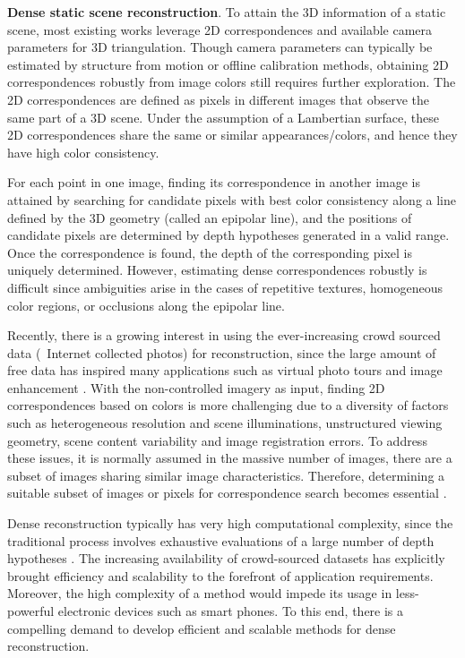 \textbf{Dense static scene reconstruction}.
To attain the 3D information of a static scene, most existing works leverage 2D correspondences and available camera parameters for 3D triangulation. Though camera parameters can typically be estimated by structure from motion or offline calibration methods, obtaining 2D correspondences robustly from image colors still requires further exploration. The 2D correspondences are defined as pixels in different images that observe the same part of a 3D scene. Under the assumption of a Lambertian surface, these 2D correspondences share the same or similar appearances/colors, and hence they have high color consistency.

For each point in one image, finding its correspondence in another image is attained by searching for candidate pixels with best color consistency along a line defined by the 3D geometry (called an epipolar line), and the positions of candidate pixels are determined by depth hypotheses generated in a valid range. Once the correspondence is found, the depth of the corresponding pixel is uniquely determined. However, estimating dense correspondences robustly is difficult since ambiguities arise in the cases of repetitive textures, homogeneous color regions, or occlusions along the epipolar line. 

Recently, there is a growing interest in using the ever-increasing crowd sourced data (\ie~Internet collected photos) for reconstruction, since the large amount of free data has inspired many applications such as virtual photo tours \cite{Snavely2} and image enhancement \cite{zhang2014personal}. With the non-controlled imagery as input, finding 2D correspondences based on colors is more challenging due to a diversity of factors such as heterogeneous resolution and scene illuminations, unstructured viewing geometry, scene content variability and image registration errors. To address these issues, it is normally assumed in the massive number of images, there are a subset of images sharing similar image characteristics. Therefore, determining a suitable subset of images or pixels for correspondence search becomes essential \cite{Goesele07}.

Dense reconstruction typically has very high computational complexity, since the traditional process involves exhaustive evaluations of a large number of depth hypotheses \cite{yang2003multi}. The increasing availability of crowd-sourced datasets has explicitly brought efficiency and scalability to the forefront of application requirements.  Moreover, the high complexity of a method would impede its usage in less-powerful electronic devices such as smart phones. To this end, there is a compelling demand to develop efficient and scalable methods for dense reconstruction.

